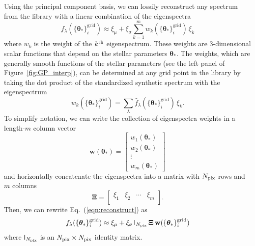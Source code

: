 \documentclass[iop,floatfix,numberedappendix,twocolappendix]{emulateapj}
\newcommand{\vt}{ {\bm \theta}}
\begin{document}
Using the principal component basis, we can lossily reconstruct any spectrum from the library with 
a linear combination of the eigenspectra
\begin{equation}
  f_\lambda(\{\vt_\ast \}^\textrm{grid}_i) \approx \xi_\mu + \xi_\sigma \sum_{k=1}^m w_k(\{\vt_\ast \}^\textrm{grid}_i) \, \xi_k
  \label{eqn:reconstruct}
\end{equation}
where $w_k$ is the weight of the $k^{\rm th}$ eigenspectrum.  These weights are 3-dimensional 
scalar functions that depend on the stellar parameters $\vt_\ast$.  The weights, which are 
generally smooth functions of the stellar parameters (see the left panel of 
Figure~\ref{fig:GP_interp}), can be determined at any grid point in the library by taking the dot 
product of the standardized synthetic spectrum with the eigenspectrum  
\begin{equation}
  w_k(\{\vt_\ast \}^\textrm{grid}_i) = \sum_\lambda \hat{f}_\lambda(\{\vt_\ast \}^\textrm{grid}_i) \, \xi_k.
\end{equation}
To simplify notation, we can write the collection of eigenspectra weights in a length-$m$ column 
vector
\begin{equation}
  \mathbf{w}(\vt_\ast) = 
  \begin{bmatrix}
    w_1(\vt_\ast )\\
    w_2(\vt_\ast )\\
    \vdots\\
    w_m(\vt_\ast )
  \end{bmatrix}
\end{equation}
and horizontally concatenate the eigenspectra into a matrix with $N_{\rm pix}$ rows and $m$ columns
\begin{equation}
  \mathbf{\Xi} = 
  \begin{bmatrix}
    \xi_1 & \xi_2 & \cdots & \xi_m \\
  \end{bmatrix} .
\end{equation}
Then, we can rewrite Eq.~(\ref{eqn:reconstruct}) as
\begin{equation}
  f_\lambda(\{\vt_\ast \}^\textrm{grid}_i) \approx \xi_\mu + \xi_\sigma \, \mathsf{I}_{N_{\rm pix}} \, \mathbf{\Xi} \, \mathbf{w}(\{\vt_\ast \}^\textrm{grid}_i)
  \label{eqn:reconstruct2}
\end{equation}
where $\mathsf{I}_{N_{\rm pix}}$ is an $N_{\rm pix} \times N_{\rm pix}$ identity matrix. 
\end{document}
